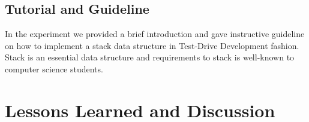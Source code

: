 \documentclass[11pt,twocolumn]{article}
\begin{document}
\subsection{Tutorial and Guideline}
In the experiment we provided a brief introduction and gave instructive
guideline on how to implement a stack data structure in Test-Drive
Development fashion. Stack is an essential data structure and requirements
to stack is well-known to computer science students. 

\section{Lessons Learned and Discussion}
\label{sec:discussion}



\end{document}
